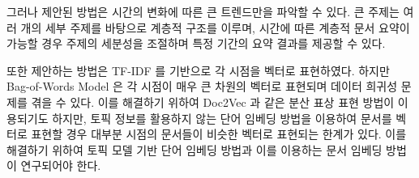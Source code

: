 \documentclass[oneside, ko,phd]{snuthesis_utf8_kor}
\begin{document}
그러나 제안된 방법은 시간의 변화에 따른 큰 트렌드만을 파악할 수 있다.
큰 주제는 여러 개의 세부 주제를 바탕으로 계층적 구조를 이루며, 시간에 따른 계층적 문서 요약이 가능할 경우 주제의 세분성을 조절하며 특정 기간의 요약 결과를 제공할 수 있다.

또한 제안하는 방법은 TF-IDF 를 기반으로 각 시점을 벡터로 표현하였다.
하지만 Bag-of-Words Model 은 각 시점이 매우 큰 차원의 벡터로 표현되며 데이터 희귀성 문제를 겪을 수 있다.
이를 해결하기 위하여 Doc2Vec 과 같은 분산 표상 표현 방법이 이용되기도 하지만, 토픽 정보를 활용하지 않는 단어 임베딩 방법을 이용하여 문서를 벡터로 표현할 경우 대부분 시점의 문서들이 비슷한 벡터로 표현되는 한계가 있다.
이를 해결하기 위하여 토픽 모델 기반 단어 임베딩 방법과 이를 이용하는 문서 임베딩 방법이 연구되어야 한다.

\newpage
\end{document}
